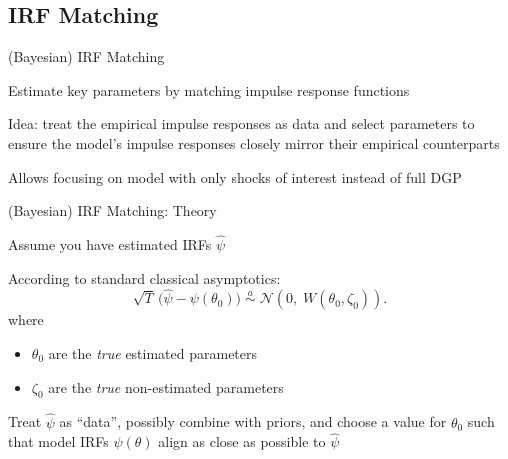 \subsection{IRF Matching}

\begin{frame}{(Bayesian) IRF Matching}
  \begin{witemize}
    \item Estimate key parameters by matching impulse response functions
    \item Idea: treat the empirical impulse responses as data and select parameters to ensure the model's impulse responses closely mirror their empirical counterparts
    \item Allows focusing on model with only shocks of interest instead of full DGP
  \end{witemize}
\end{frame}

\begin{frame}{(Bayesian) IRF Matching: Theory}
  \begin{witemize}
    \item Assume you have estimated IRFs $\hat{\psi}$
    \item According to standard classical asymptotics:
    \begin{equation}
      \sqrt{T}\,\bigl( \hat{\psi} - \psi(\theta_{0}) \bigr)
      \;\overset{a}{\sim}\; \mathcal{N}\!\left(0,\; W(\theta_{0}, \zeta_{0})\right).
    \end{equation}
    where
    \begin{itemize}
      \item $\theta_{0}$ are the \emph{true} estimated parameters
      \item $\zeta_{0}$ are the \emph{true} non-estimated parameters
    \end{itemize}
    \item Treat $\hat{\psi}$ as ``data'', possibly combine with priors, and choose a value for $\theta_{0}$ such that model IRFs $\psi(\theta)$ align as close as possible to $\hat{\psi}$
  \end{witemize}
\end{frame}



